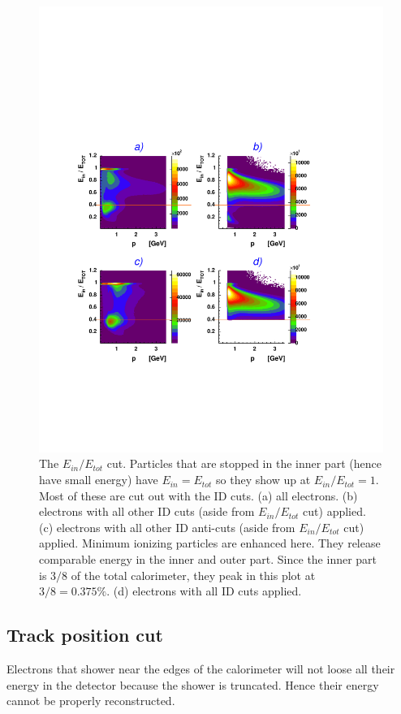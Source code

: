 \begin{figure}[h]
\begin{center}
  \includegraphics[width=12cm, bb=60 120 490 560]{data_reduction/img/ec3_pid}
  \caption[ The $E_{in}/E_{tot}$ cut.]
          { The $E_{in}/E_{tot}$ cut. Particles that are stopped in the inner part (hence
	             have small energy) have $E_{in} = E_{tot}$ so they show up at  $E_{in}/E_{tot}=1$.
		     Most of these are cut out with the ID cuts.		   
	             (a) all electrons.
		     (b) electrons with all other ID cuts (aside from $E_{in}/E_{tot}$ cut) applied. 
       	      	     (c) electrons with all other ID 
		     anti-cuts (aside from $E_{in}/E_{tot}$  cut) applied. 		      
                     Minimum ionizing particles are enhanced here. They release comparable 
		     energy in the inner and outer part. Since the inner part is $3/8$ of the 
		     total calorimeter, they peak in this plot at $3/8=0.375\%$.
                     (d) electrons with all ID cuts applied.}	  
 \label{fig:ec3cut}
 \end{center}
\end{figure}

\subsection{Track position cut}
Electrons that shower near the edges of the calorimeter will not loose
all their energy in the detector because the shower is truncated.
Hence their energy cannot be properly reconstructed.

